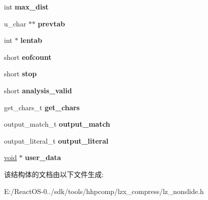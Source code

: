 \begin{DoxyCompactItemize}
\item 
\mbox{\label{structlz__info_aa9036b3fdfbf4f05a904034adafba532}} 
int {\bfseries max\+\_\+dist}
\item 
\mbox{\label{structlz__info_abc4cb85cf4c4e4e3e426fa22195480f7}} 
u\+\_\+char $\ast$$\ast$ {\bfseries prevtab}
\item 
\mbox{\label{structlz__info_ad70a4cb4583387ada3fd40a2d95976c0}} 
int $\ast$ {\bfseries lentab}
\item 
\mbox{\label{structlz__info_ab731938fefe1368ab684f4152f577e9e}} 
short {\bfseries eofcount}
\item 
\mbox{\label{structlz__info_a535c57e1d97c116f3a437e584d0fa01d}} 
short {\bfseries stop}
\item 
\mbox{\label{structlz__info_a72890152ba4192e654e81089b9d4c803}} 
short {\bfseries analysis\+\_\+valid}
\item 
\mbox{\label{structlz__info_a836b14b82811b23cf55a6dc07ac431dd}} 
get\+\_\+chars\+\_\+t {\bfseries get\+\_\+chars}
\item 
\mbox{\label{structlz__info_a12ae25274926a13ddfbc3bfef8463d23}} 
output\+\_\+match\+\_\+t {\bfseries output\+\_\+match}
\item 
\mbox{\label{structlz__info_a37e52480e7a79dc29ba2f7f4e2be6648}} 
output\+\_\+literal\+\_\+t {\bfseries output\+\_\+literal}
\item 
\mbox{\label{structlz__info_a778b118df34d30e6c2b32af0c390ca8a}} 
\hyperlink{interfacevoid}{void} $\ast$ {\bfseries user\+\_\+data}
\end{DoxyCompactItemize}


该结构体的文档由以下文件生成\+:\begin{DoxyCompactItemize}
\item 
E\+:/\+React\+O\+S-\/0../sdk/tools/hhpcomp/lzx\+\_\+compress/lz\+\_\+nonslide.\+h\end{DoxyCompactItemize}
